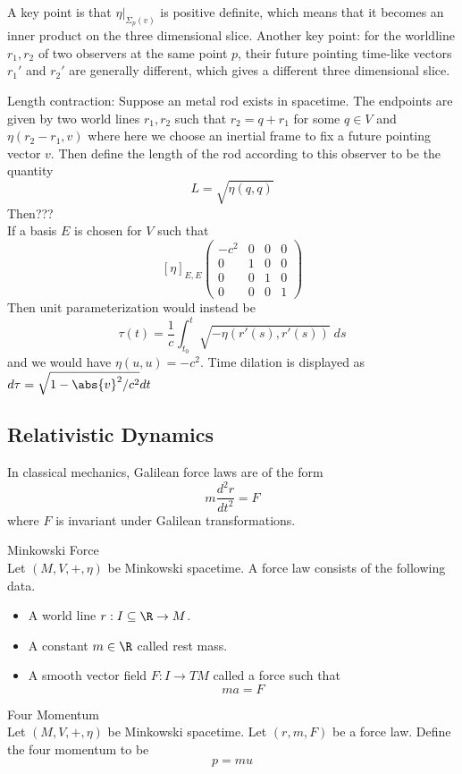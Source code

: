 \documentclass[a4paper]{article}
\begin{document}
A key point is that $\eta|_{\Sigma_p(v)}$ is positive definite, which means that it becomes an inner product on the three dimensional slice. Another key point: for the worldline $r_1,r_2$ of two observers at the same point $p$, their future pointing time-like vectors $r_1'$ and $r_2'$ are generally different, which gives a different three dimensional slice. 

Length contraction: Suppose an metal rod exists in spacetime. The endpoints are given by two world lines $r_1,r_2$ such that $r_2=q+r_1$ for some $q\in V$ and $\eta(r_2-r_1,v)$ where here we choose an inertial frame to fix a future pointing vector $v$. Then define the length of the rod according to this observer to be the quantity $$L=\sqrt{\eta(q,q)}$$ Then???\\

If a basis $E$ is chosen for $V$ such that $$[\eta]_{E,E}\begin{pmatrix}
-c^2 & 0 & 0 & 0\\
0 & 1 & 0 & 0\\
0 & 0 & 1 & 0\\
0 & 0 & 0 & 1
\end{pmatrix}$$ Then unit parameterization would instead be $$\tau(t)=\frac{1}{c}\int_{t_0}^t\sqrt{-\eta(r'(s),r'(s))}\;ds$$ and we would have $\eta(u,u)=-c^2$. Time dilation is displayed as $d\tau=\sqrt{1-\abs{v}^2/c^2}dt$

\subsection{Relativistic Dynamics}
In classical mechanics, Galilean force laws are of the form $$m\frac{d^2r}{dt^2}=F$$ where $F$ is invariant under Galilean transformations. 

\begin{defn}{Minkowski Force}{}\\
Let $(M,V,+,\eta)$ be Minkowski spacetime. A force law consists of the following data. 
\begin{itemize}
\item A world line $r:I\subseteq\R\to M$. 
\item A constant $m\in\R$ called rest mass. 
\item A smooth vector field $F:I\to TM$ called a force such that $$ma=F$$
\end{itemize}
\end{defn}

\begin{defn}{Four Momentum}{}\\
Let $(M,V,+,\eta)$ be Minkowski spacetime. Let $(r,m,F)$ be a force law. Define the four momentum to be $$p=mu$$
\end{defn}
\end{document}
